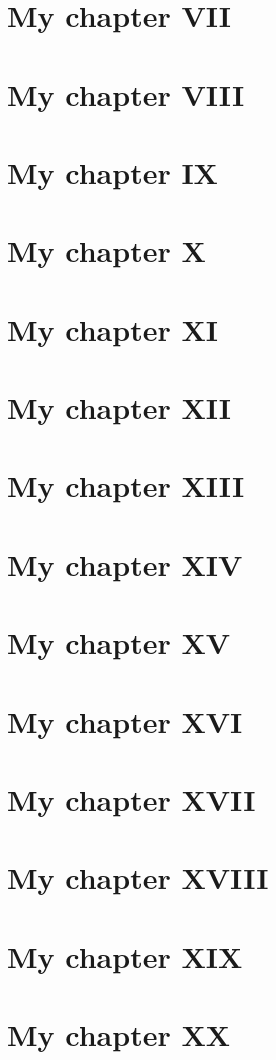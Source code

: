 \documentclass[open=any, titlepage=false, twocolumn, fontsize=10pt,]{scrbook}
\begin{document}
    \chapter{My chapter VII}
    \chapter{My chapter VIII}
    \chapter{My chapter IX}
    \chapter{My chapter X}
    \chapter{My chapter XI}
    \chapter{My chapter XII}
    \chapter{My chapter XIII}
    \chapter{My chapter XIV}
    \chapter{My chapter XV}
    \chapter{My chapter XVI}
    \chapter{My chapter XVII}
    \chapter{My chapter XVIII}
    \chapter{My chapter XIX}
    \chapter{My chapter XX}
\end{document}
